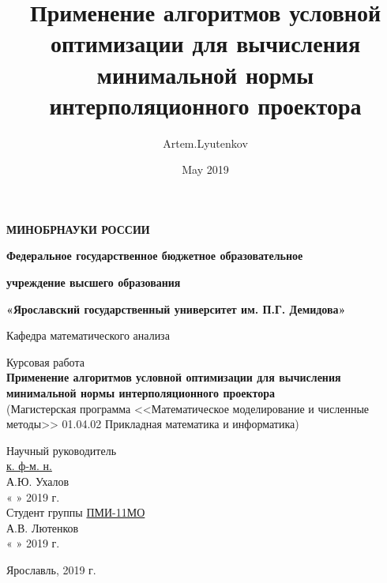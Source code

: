 \documentclass[12pt]{article} %
\title{Применение алгоритмов условной оптимизации для вычисления минимальной нормы интерполяционного проектора}
\author{Artem.Lyutenkov }
\date{May 2019}
\begin{document}
	\begin{titlepage} 
		 \begin{center}
			\large
			\textbf{МИНОБРНАУКИ РОССИИ}
			
			
			\vspace{0.5cm}
			
		\textbf{Федеральное государственное бюджетное образовательное}
		
		\textbf{учреждение высшего образования}
		
		\textbf{«Ярославский государственный университет им. П.Г. Демидова»}
			\vspace{0.25cm}
			
			
			Кафедра математического анализа
			\vfill
			
			Курсовая работа \\
			\textbf{Применение алгоритмов условной оптимизации для вычисления минимальной нормы интерполяционного проектора} \\
			(Магистерская программа <<Математическое моделирование и численные методы>> 01.04.02 Прикладная математика и информатика) 
			\vfill
			
			
			\bigskip
			
			
		\end{center}

\begin{flushright} 
	Научный руководитель\\ 
	\underline{\phantom{aaааааa}к. ф-м. н.\phantom{aааааaa}}\\ 
	\vspace{0.1cm} 
	\underline{\phantom{aaaaaaaaaaaaa}} А.Ю. Ухалов\\ 
	« 
	\underline{\phantom{aaa}} 
	» 
	\underline{\phantom{aaaaaaaaaaaaa}} 2019 г.\\ 
	\vspace{0.5cm} 
	Студент группы \underline{\phantom{a}ПМИ-11МО\phantom{a}}\\ 
	\vspace{0.1cm} 
	\underline{\phantom{aaaaaaaaaaaaa}} А.В. Лютенков\\ 
	« 
	\underline{\phantom{aaa}} 
	» 
	\underline{\phantom{aaaaaaaaaaaaaa}}2019 г.\\ 
	\vspace{1cm} 
\end{flushright} 
		\begin{center}
			Ярославль, 2019 г.
		\end{center}
\end{titlepage}
\tableofcontents \thispagestyle{empty}
\setcounter{page}{3}
\end{document}
